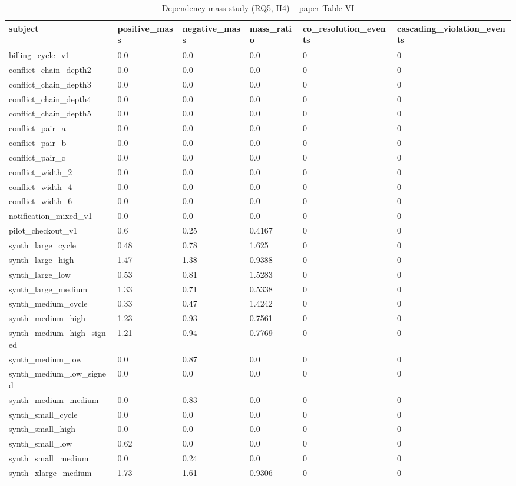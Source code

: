 \begin{table}[t]
\centering
\caption{Dependency-mass study (RQ5, H4) -- paper Table VI}
\label{tab:depmass}
\begin{tabular}{llllll}
\toprule
subject & positive\_mass & negative\_mass & mass\_ratio & co\_resolution\_events & cascading\_violation\_events \\
\midrule
billing\_cycle\_v1 & 0.0 & 0.0 & 0.0 & 0 & 0 \\
conflict\_chain\_depth2 & 0.0 & 0.0 & 0.0 & 0 & 0 \\
conflict\_chain\_depth3 & 0.0 & 0.0 & 0.0 & 0 & 0 \\
conflict\_chain\_depth4 & 0.0 & 0.0 & 0.0 & 0 & 0 \\
conflict\_chain\_depth5 & 0.0 & 0.0 & 0.0 & 0 & 0 \\
conflict\_pair\_a & 0.0 & 0.0 & 0.0 & 0 & 0 \\
conflict\_pair\_b & 0.0 & 0.0 & 0.0 & 0 & 0 \\
conflict\_pair\_c & 0.0 & 0.0 & 0.0 & 0 & 0 \\
conflict\_width\_2 & 0.0 & 0.0 & 0.0 & 0 & 0 \\
conflict\_width\_4 & 0.0 & 0.0 & 0.0 & 0 & 0 \\
conflict\_width\_6 & 0.0 & 0.0 & 0.0 & 0 & 0 \\
notification\_mixed\_v1 & 0.0 & 0.0 & 0.0 & 0 & 0 \\
pilot\_checkout\_v1 & 0.6 & 0.25 & 0.4167 & 0 & 0 \\
synth\_large\_cycle & 0.48 & 0.78 & 1.625 & 0 & 0 \\
synth\_large\_high & 1.47 & 1.38 & 0.9388 & 0 & 0 \\
synth\_large\_low & 0.53 & 0.81 & 1.5283 & 0 & 0 \\
synth\_large\_medium & 1.33 & 0.71 & 0.5338 & 0 & 0 \\
synth\_medium\_cycle & 0.33 & 0.47 & 1.4242 & 0 & 0 \\
synth\_medium\_high & 1.23 & 0.93 & 0.7561 & 0 & 0 \\
synth\_medium\_high\_signed & 1.21 & 0.94 & 0.7769 & 0 & 0 \\
synth\_medium\_low & 0.0 & 0.87 & 0.0 & 0 & 0 \\
synth\_medium\_low\_signed & 0.0 & 0.0 & 0.0 & 0 & 0 \\
synth\_medium\_medium & 0.0 & 0.83 & 0.0 & 0 & 0 \\
synth\_small\_cycle & 0.0 & 0.0 & 0.0 & 0 & 0 \\
synth\_small\_high & 0.0 & 0.0 & 0.0 & 0 & 0 \\
synth\_small\_low & 0.62 & 0.0 & 0.0 & 0 & 0 \\
synth\_small\_medium & 0.0 & 0.24 & 0.0 & 0 & 0 \\
synth\_xlarge\_medium & 1.73 & 1.61 & 0.9306 & 0 & 0 \\
\bottomrule
\end{tabular}
\end{table}
